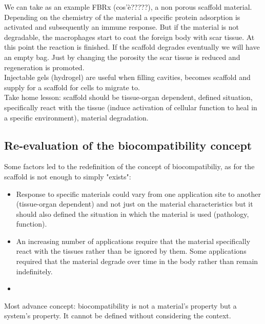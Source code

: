 	We can take as an example FBRx (cos'è?????), a non porous scaffold material.
	Depending on the chemistry of the material a specific protein adsorption is activated and subsequently an immune response.
	But if the material is not degradable, the macrophages start to coat the foreign body with scar tissue.
	At this point the reaction is finished.
	If the scaffold degrades eventually we will have an empty bag.
	Just by changing the porosity the scar tissue is reduced and regeneration is promoted.
	\\
	Injectable gels (hydrogel) are useful when filling cavities, becomes scaffold and supply for a scaffold for cells to migrate to.
	\\
	Take home lesson: scaffold should be tissue-organ dependent, defined situation, specifically react with the tissue (induce activation of cellular function to heal in a specific environment), material degradation.

	\subsection{Re-evaluation of the biocompatibility concept}
	Some factors led to the redefinition of the concept of biocompatibiliy, as for the scaffold is not enough to simply "exists":

	\begin{multicols}{2}
		\begin{itemize}
			\item Response to specific materials could vary from one application site to another (tissue-organ dependent) and not just on the material characteristics but it should also defined the situation in which the material is used (pathology, function).
			\item An increasing number of applications require that the material specifically react with the tissues rather than be ignored by them.
				Some applications required that the material degrade over time in the body rather than remain indefinitely.
			\item
		\end{itemize}
	\end{multicols}

	Most advance concept: biocompatibility is not a material's property but a system's property. It cannot be defined without considering the context.


